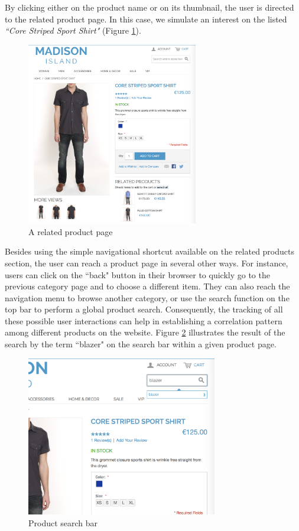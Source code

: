 By clicking either on the product name or on its thumbnail, the user is directed to the related product page. In this case, we simulate an interest on the listed \textit{``Core Striped Sport Shirt"} (Figure \ref{fig:product-detail2}).

\vspace{0.5cm}
\begin{figure}[H]
  \centering
    \includegraphics[height=8cm]{images/madison/product-detail2.png}
  \caption{A related product page}
  \label{fig:product-detail2}
\end{figure}
\vspace{0.5cm}

Besides using the simple navigational shortcut available on the related products section, the user can reach a product page in several other ways. For instance, users can click on the ``back" button in their browser to quickly go to the previous category page and to choose a different item. They can also reach the navigation menu to browse another category, or use the search function on the top bar to perform a global product search.
Consequently, the tracking of all these possible user interactions can help in establishing a correlation pattern among different products on the website. Figure \ref{fig:product-search} illustrates the result of the search by the term ``blazer" on the search bar within a given product page.

\vspace{0.5cm}
\begin{figure}[H]
  \centering
    \includegraphics[height=7cm]{images/madison/search.png}
  \caption{Product search bar}
  \label{fig:product-search}
\end{figure}
\vspace{0.5cm}

